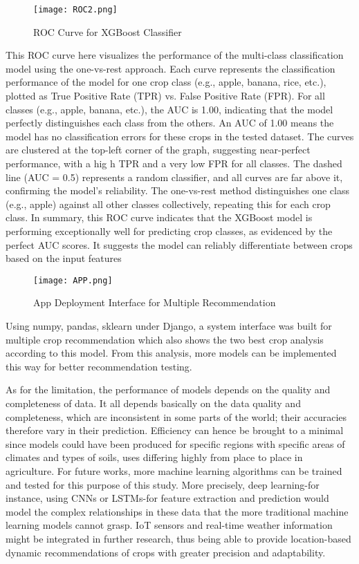 \documentclass[conference]{IEEEtran}
\begin{document}
\begin{figure}[h]
    \centering
    \texttt{[image: ROC2.png]}
    \caption{ROC Curve for XGBoost Classifier}
    \label{fig:rocxgboost}
\end{figure}

This ROC curve here visualizes the performance of the multi-class classification model using the one-vs-rest approach. Each curve represents the classification performance of the model for one crop class (e.g., apple, banana, rice, etc.), plotted as True Positive Rate (TPR) vs. False Positive Rate (FPR). For all classes (e.g., apple, banana, etc.), the AUC is 1.00, indicating that the model perfectly distinguishes each class from the others. An AUC of 1.00 means the model has no classification errors for these crops in the tested dataset. The curves are clustered at the top-left corner of the graph, suggesting near-perfect performance, with a hig h TPR and a very low FPR for all classes. The dashed line (AUC = 0.5) represents a random classifier, and all curves are far above it, confirming the model’s reliability. The one-vs-rest method distinguishes one class (e.g., apple) against all other classes collectively, repeating this for each crop class.
In summary, this ROC curve indicates that the XGBoost model is performing exceptionally well for predicting crop classes, as evidenced by the perfect AUC scores. It suggests the model can reliably differentiate between crops based on the input features


\begin{figure}[h]
    \centering
    \texttt{[image: APP.png]}
    \caption{App Deployment Interface for Multiple Recommendation }
    \label{fig:rocxgboost}
\end{figure}


Using numpy, pandas, sklearn under Django, a system interface was built for multiple crop recommendation which also shows the two best crop analysis according to this model. From this analysis, more models can be implemented this way for better recommendation testing.\cite{waseeAhsan2024}

As for the limitation, the performance of models depends on the quality and completeness of data. It all depends basically on the data quality and completeness, which are inconsistent in some parts of the world; their accuracies therefore vary in their prediction. Efficiency can hence be brought to a minimal since models could have been produced for specific regions with specific areas of climates and types of soils, uses differing highly from place to place in agriculture. 
For future works, more machine learning algorithms can be trained and tested for this purpose of this study. More precisely, deep learning-for instance, using CNNs or LSTMs-for feature extraction and prediction would model the complex relationships in these data that the more traditional machine learning models cannot grasp. IoT sensors and real-time weather information might be integrated in further research, thus being able to provide location-based dynamic recommendations of crops with greater precision and adaptability. 
\end{document}
